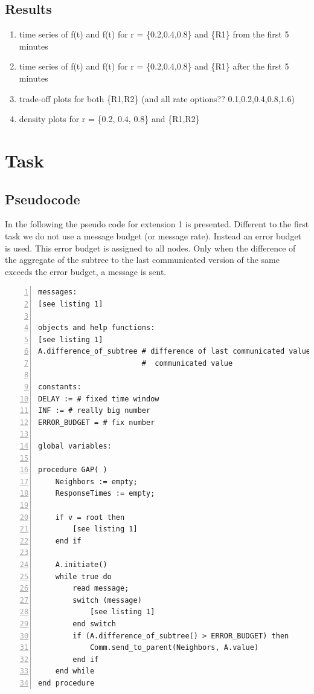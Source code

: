 \documentclass[a4paper, smallheadings,english]{scrartcl}
\begin{document}
\subsection{Results}
\begin{enumerate}
    \item time series of f(t) and f(t) for r = \{0.2,0.4,0.8\} and \{R1\} from the first 5 minutes
    \item time series of f(t) and f(t) for r = \{0.2,0.4,0.8\} and \{R1\} after the first 5 minutes
    \item trade-off plots for both \{R1,R2\} (and all rate options?? 0.1,0.2,0.4,0.8,1.6)
    \item density plots for r = \{0.2, 0.4, 0.8\} and \{R1,R2\}
\end{enumerate}

\section{Task}
\label{sec:task2}
\subsection{Pseudocode}
In the following the pseudo code for extension 1 is presented. Different to the first task we do not use a message budget (or message rate). Instead an error budget is used. This error budget is assigned to all nodes. Only when the difference of the aggregate of the subtree to the last communicated version of the same exceeds the error budget, a message is sent.

\begin{lstlisting}[caption={Pseudocode for $\widetilde{f}(t)$ with error budget in $P_1$}, label={lst:2}, numbers=left, frame=single]
messages:
[see listing 1]

objects and help functions:
[see listing 1]
A.difference_of_subtree # difference of last communicated value versus current
                        #  communicated value

constants:
DELAY := # fixed time window
INF := # really big number
ERROR_BUDGET = # fix number

global variables:

procedure GAP( )
    Neighbors := empty;
    ResponseTimes := empty;

    if v = root then
        [see listing 1]
    end if

    A.initiate()
    while true do
        read message;
        switch (message)
            [see listing 1]
        end switch
        if (A.difference_of_subtree() > ERROR_BUDGET) then
            Comm.send_to_parent(Neighbors, A.value)
        end if
    end while
end procedure
\end{lstlisting}
\end{document}
